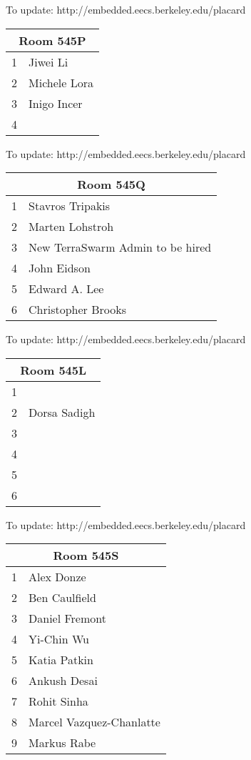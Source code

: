 \documentclass{article}
\begin{document}
{\scriptsize To update: http://embedded.eecs.berkeley.edu/placard}
\vspace{1in}

\noindent
\begin{tabular}{|l|l|}
\hline
\multicolumn{2}{|c|}{Room 545P} \\ \hline\hline
1&Jiwei Li\\
2&Michele Lora\\
3&Inigo Incer\\
4& \\

\hline
\end{tabular}

{\scriptsize To update: http://embedded.eecs.berkeley.edu/placard}
\vspace{1in}

\noindent
\begin{tabular}{|l|l|}
\hline
\multicolumn{2}{|c|}{Room 545Q} \\ \hline\hline
1&Stavros Tripakis\\
2&Marten Lohstroh\\
3&New TerraSwarm Admin to be hired\\
4&John Eidson\\
5&Edward A. Lee\\
6&Christopher Brooks\\

\hline
\end{tabular}

{\scriptsize To update: http://embedded.eecs.berkeley.edu/placard}
\vspace{1in}

\noindent
\begin{tabular}{|l|l|}
\hline
\multicolumn{2}{|c|}{Room 545L} \\ \hline\hline
1& \\
2&Dorsa Sadigh\\
3& \\
4& \\
5& \\
6& \\

\hline
\end{tabular}

{\scriptsize To update: http://embedded.eecs.berkeley.edu/placard}
\vspace{1in}

\noindent
\begin{tabular}{|l|l|}
\hline
\multicolumn{2}{|c|}{Room 545S} \\ \hline\hline
1&Alex Donze\\
2&Ben  Caulfield\\
3&Daniel Fremont\\
4&Yi-Chin Wu\\
5&Katia Patkin\\
6&Ankush Desai\\
7&Rohit Sinha\\
8&Marcel  Vazquez-Chanlatte\\
9&Markus Rabe\\

\hline
\end{tabular}
\end{document}
